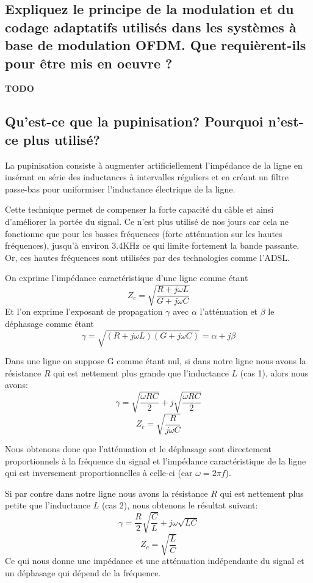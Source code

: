 \subsection{Expliquez le principe de la modulation et du codage adaptatifs utilisés dans les systèmes à base de modulation OFDM. Que requièrent-ils pour \^etre mis en oeuvre ?}
\textbf{TODO}

\subsection{Qu'est-ce que la pupinisation? Pourquoi n'est-ce plus utilisé?}

La pupinisation consiste à augmenter artificiellement l'impédance de la ligne en insérant en série des inductances à intervalles réguliers et en créant un filtre passe-bas pour uniformiser l'inductance électrique de la ligne.

Cette technique permet de compenser la forte capacité du câble et ainsi d'améliorer la portée du signal. Ce n'est plus utilisé de nos jours car cela ne fonctionne que pour les basses fréquences (forte atténuation sur les hautes fréquences), jusqu'à environ 3.4KHz ce qui limite fortement la bande passante. Or, ces hautes fréquences sont utilisées par des technologies comme l'ADSL.

On exprime l'impédance caractéristique d'une ligne comme étant $$Z_c = \sqrt{\frac{R + j\omega L}{G + j\omega C}}$$ Et l'on exprime l'exposant de propagation $\gamma$ avec $\alpha$ l'atténuation et $\beta$ le déphasage comme étant $$\gamma = \sqrt{(R + j\omega L)(G + j\omega C)} = \alpha + j\beta$$ 

Dans une ligne on suppose G comme étant nul, si dans notre ligne nous avons la résistance $R$ qui est nettement plus grande que l'inductance $L$ (cas 1), alors nous avons: $$\gamma = \sqrt{\frac{\omega RC}{2}} + j\sqrt{\frac{\omega RC}{2}}$$ $$Z_c = \sqrt{\frac{R}{j\omega C}}$$

Nous obtenons donc que l'atténuation et le déphasage sont directement proportionnels à la fréquence du signal et l'impédance caractéristique de la ligne qui est inversement proportionnelles à celle-ci (car $\omega = 2\pi f$).

Si par contre dans notre ligne nous avons la résistance $R$ qui est
nettement plus petite que l'inductance $L$ (cas 2), nous obtenons le résultat suivant: $$\gamma = \frac{R}{2}\sqrt{\frac{C}{L}} + j\omega \sqrt{LC}$$ $$Z_c = \sqrt{\frac{L}{C}}$$ Ce qui nous donne une impédance et une atténuation indépendante du signal et un déphasage qui dépend de la fréquence.

